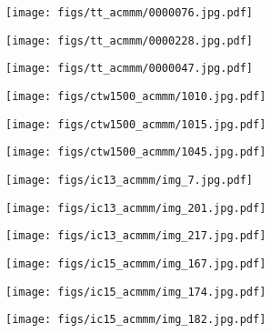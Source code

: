 \documentclass[sigconf]{acmart}
\begin{document}
\begin{figure*}[t!]
    \centering
    \begin{subfigure}{0.30\linewidth}
        \centering
        \texttt{[image: figs/tt\_acmmm/0000076.jpg.pdf]}
    \end{subfigure}
    \begin{subfigure}{0.30\linewidth}
        \centering
        \texttt{[image: figs/tt\_acmmm/0000228.jpg.pdf]}
    \end{subfigure}
    \begin{subfigure}{0.30\linewidth}
        \centering
        \texttt{[image: figs/tt\_acmmm/0000047.jpg.pdf]}
    \end{subfigure}
    
    \begin{subfigure}{0.30\linewidth}
        \centering
        \texttt{[image: figs/ctw1500\_acmmm/1010.jpg.pdf]}
    \end{subfigure}
    \begin{subfigure}{0.30\linewidth}
        \centering
        \texttt{[image: figs/ctw1500\_acmmm/1015.jpg.pdf]}
    \end{subfigure}
    \begin{subfigure}{0.30\linewidth}
        \centering
        \texttt{[image: figs/ctw1500\_acmmm/1045.jpg.pdf]}
    \end{subfigure}
    
    \begin{subfigure}{0.30\linewidth}
        \centering
        \texttt{[image: figs/ic13\_acmmm/img\_7.jpg.pdf]}
    \end{subfigure}
    \begin{subfigure}{0.30\linewidth}
        \centering
        \texttt{[image: figs/ic13\_acmmm/img\_201.jpg.pdf]}
    \end{subfigure}
    \begin{subfigure}{0.30\linewidth}
        \centering
        \texttt{[image: figs/ic13\_acmmm/img\_217.jpg.pdf]}
    \end{subfigure}
    
    \begin{subfigure}{0.30\linewidth}
        \centering
        \texttt{[image: figs/ic15\_acmmm/img\_167.jpg.pdf]}
    \end{subfigure}
    \begin{subfigure}{0.30\linewidth}
        \centering
        \texttt{[image: figs/ic15\_acmmm/img\_174.jpg.pdf]}
    \end{subfigure}
    \begin{subfigure}{0.30\linewidth}
        \centering
        \texttt{[image: figs/ic15\_acmmm/img\_182.jpg.pdf]}
    \end{subfigure}









\end{figure*}
\end{document}
